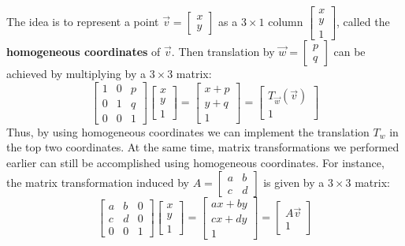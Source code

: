 \documentclass{ximera}
\begin{document}
The idea is to represent a point $\vec{v} = \left[
\begin{array}{r}
x\\
y
\end{array}
\right]$
 as a $3 \times 1$ column $\left[
 \begin{array}{r}
 x\\
 y\\
 1
 \end{array}
 \right]$, called the \textbf{homogeneous coordinates} of $\vec{v}$. Then translation by $\vec{w} = \left[
 \begin{array}{r}
 p\\
 q
 \end{array}
 \right]$ can be achieved by multiplying by a $3 \times 3$ matrix:
\begin{equation*}
\left[
\begin{array}{rrr}
1 & 0 & p\\
0 & 1 & q\\
0 & 0 & 1
\end{array}
\right] \left[
\begin{array}{r}
x\\
y\\
1
\end{array}
\right]
=
\left[
\begin{array}{c}
x + p\\
y + q\\
1
\end{array}
\right]
=
\left[
\begin{array}{c}
T_{\vec{w}}(\vec{v})\\
1
\end{array}
\right]
\end{equation*}
Thus, by using homogeneous coordinates we can implement the translation $T_{w}$ in the top two coordinates. At the same time, matrix transformations we performed earlier can still be accomplished using homogeneous coordinates.  For instance, the matrix transformation induced by $A = \left[
\begin{array}{rr}
a & b\\
c & d
\end{array}
\right]$ is given by a $3 \times 3$ matrix:
\begin{equation*}
\left[
\begin{array}{rrr}
a & b & 0\\
c & d & 0\\
0 & 0 & 1
\end{array}
\right] \left[
\begin{array}{r}
x\\
y\\
1
\end{array}
\right]
=
\left[
\begin{array}{c}
ax + by\\
cx + dy\\
1
\end{array}
\right]
=
\left[
\begin{array}{c}
A\vec{v}\\
1
\end{array}
\right]
\end{equation*}
\end{document}
